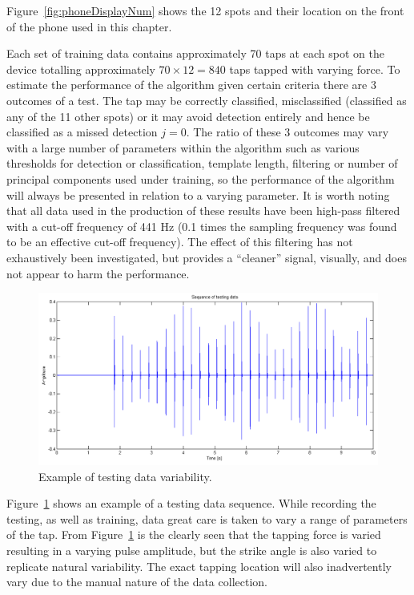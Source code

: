 Figure~\ref{fig:phoneDisplayNum} shows the 12 spots and their location on the front of the phone used in this chapter.

Each set of training data contains approximately 70 taps at each spot on the device totalling approximately $70 \times 12 = 840$ taps tapped with varying force. To estimate the performance of the algorithm given certain criteria there are 3 outcomes of a test. The tap may be correctly classified, misclassified (classified as any of the 11 other spots) or it may avoid detection entirely and hence be classified as a missed detection $j=0$. The ratio of these 3 outcomes may vary with a large number of parameters within the algorithm such as various thresholds for detection or classification, template length, filtering or number of principal components used under training, so the performance of the algorithm will always be presented in relation to a varying parameter. It is worth noting that all data used in the production of these results have been high-pass filtered with a cut-off frequency of 441 Hz (0.1 times the sampling frequency was found to be an effective cut-off frequency). The effect of this filtering has not exhaustively been investigated, but provides a ``cleaner'' signal, visually, and does not appear to harm the performance.

\begin{figure}[!]
\centering
\includegraphics[width=410 px]{dataSequence.png}
\caption{Example of testing data variability.}\label{fig:dataSequence}
\end{figure}

Figure~\ref{fig:dataSequence} shows an example of a testing data sequence. While recording the testing, as well as training, data great care is taken to vary a range of parameters of the tap. From Figure~\ref{fig:dataSequence} is the clearly seen that the tapping force is varied resulting in a varying pulse amplitude, but the strike angle is also varied to replicate natural variability. The exact tapping location will also inadvertently vary due to the manual nature of the data collection.


